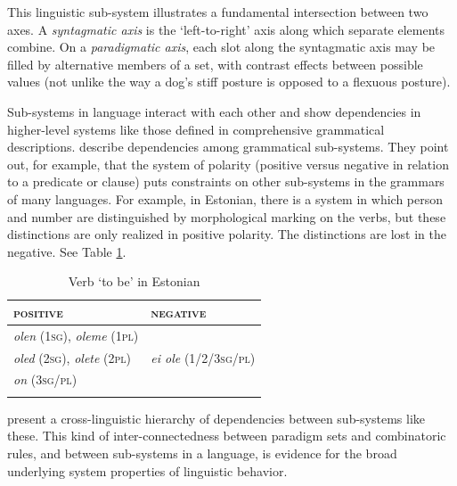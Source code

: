 This linguistic sub-system illustrates a fundamental 
intersection between two axes. A \textit{syntagmatic axis} is the `left-to-right' axis along 
which separate elements combine. On a \textit{paradigmatic axis}, each slot along the syntagmatic axis
may be filled by alternative members of a set, with contrast 
effects between possible values (not unlike the way a dog's stiff posture 
is opposed to a flexuous posture). 



Sub-systems in language interact with each other and show dependencies 
in higher-level systems like those defined in comprehensive 
grammatical descriptions. \citet{aikhenvald_dependencies_1998} describe 
dependencies among grammatical sub-systems. They point out, for example, that 
the system of polarity (positive versus negative in relation to a 
predicate or clause) puts constraints on other sub-systems in the grammars of 
many languages. For example, in Estonian, there is a system in which person and number are 
distinguished by morphological marking on the verbs, but these 
distinctions are only realized in positive polarity. The distinctions 
are lost in the negative. See Table \ref{verbtobeinestonian}.





\begin{table}[h]
\centering
\begin{tabular}{ll}
\lsptoprule
\textsc{positive} & \textsc{negative} \\
\midrule
\textit{olen} (\textsc{1sg)}, \textit{oleme} (\textsc{1pl}) 
& \\

\textit{oled} (\textsc{2sg)}, \textit{olete }(\textsc{2pl)} & 
\textit{ei ole} (1/2/3\textsc{sg/pl}) \\

\textit{on} (\textsc{3sg/pl}) & \\
\lspbottomrule
\end{tabular}
\caption{Verb \textquoteleft to be' in Estonian}
\label{verbtobeinestonian}
\end{table}


\citet{aikhenvald_dependencies_1998} present a cross-linguistic hierarchy of dependencies between sub-systems like these. This kind of inter-connectedness between 
paradigm sets and combinatoric rules, and between sub-systems in a 
language, is evidence for the broad underlying system properties of 
linguistic behavior. 



